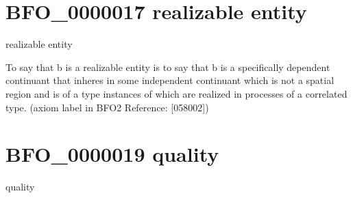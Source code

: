 \documentclass[letterpaper,10pt,english]{sphinxmanual}
\begin{document}
\section{BFO\_0000017 \sphinxhyphen{} realizable entity}
\label{\detokenize{doc-BFO_0000017:bfo-0000017-realizable-entity}}\label{\detokenize{doc-BFO_0000017:index-0}}\label{\detokenize{doc-BFO_0000017::doc}}
\begin{sphinxShadowBox}

\sphinxAtStartPar
realizable entity
\end{sphinxShadowBox}

\begin{sphinxShadowBox}

\sphinxAtStartPar
To say that b is a realizable entity is to say that b is a specifically dependent continuant that inheres in some independent continuant which is not a spatial region and is of a type instances of which are realized in processes of a correlated type. (axiom label in BFO2 Reference: {[}058\sphinxhyphen{}002{]})
\end{sphinxShadowBox}

\begin{sphinxShadowBox}

\sphinxAtStartPar
{}
\end{sphinxShadowBox}
\begin{quote}
\label{\detokenize{doc-BFO_0000019:bfo-0000019}}\label{\detokenize{doc-BFO_0000019:quality}}\label{\detokenize{doc-BFO_0000019:bfo-0000019}}
\ignorespaces \end{quote}


\section{BFO\_0000019 \sphinxhyphen{} quality}
\label{\detokenize{doc-BFO_0000019:bfo-0000019-quality}}\label{\detokenize{doc-BFO_0000019:index-0}}\label{\detokenize{doc-BFO_0000019::doc}}
\begin{sphinxShadowBox}

\sphinxAtStartPar
quality
\end{sphinxShadowBox}
\end{document}
